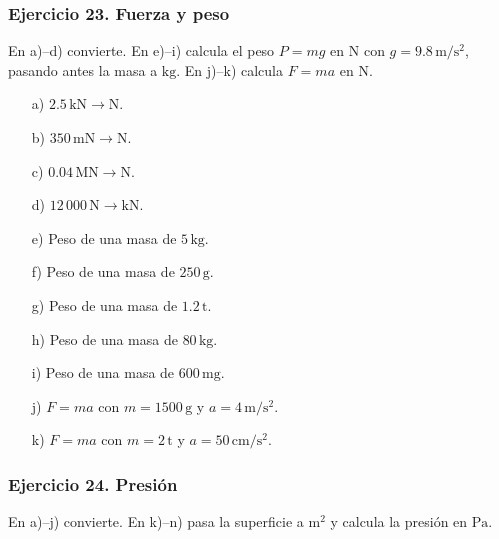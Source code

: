 \subsubsection*{Ejercicio 23. Fuerza y peso}

En a)--d) convierte.
En e)--i) calcula el peso $P=mg$ en $\mathrm{N}$
con $g=9.8\,\mathrm{m/s^2}$, pasando antes la masa a $\mathrm{kg}$.
En j)--k) calcula $F=ma$ en $\mathrm{N}$.

\begin{enumerate}
    \item[a)] $2.5\,\mathrm{kN}\rightarrow\mathrm{N}$.
    \item[b)] $350\,\mathrm{mN}\rightarrow\mathrm{N}$.
    \item[c)] $0.04\,\mathrm{MN}\rightarrow\mathrm{N}$.
    \item[d)] $12\,000\,\mathrm{N}\rightarrow\mathrm{kN}$.
    \item[e)] Peso de una masa de $5\,\mathrm{kg}$.
    \item[f)] Peso de una masa de $250\,\mathrm{g}$.
    \item[g)] Peso de una masa de $1.2\,\mathrm{t}$.
    \item[h)] Peso de una masa de $80\,\mathrm{kg}$.
    \item[i)] Peso de una masa de $600\,\mathrm{mg}$.
    \item[j)] $F=ma$ con $m=1500\,\mathrm{g}$
    y $a=4\,\mathrm{m/s^2}$.
    \item[k)] $F=ma$ con $m=2\,\mathrm{t}$
    y $a=50\,\mathrm{cm/s^2}$.
\end{enumerate}

\subsubsection*{Ejercicio 24. Presión}

En a)--j) convierte.
En k)--n) pasa la superficie a $\mathrm{m^2}$
y calcula la presión en $\mathrm{Pa}$.

